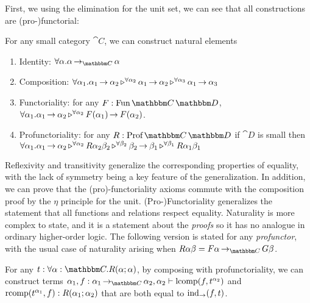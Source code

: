 \documentclass{llncs}
\begin{document}
First, we using the elimination for the unit set, we can see that all
constructions are (pro-)functorial:
\begin{construction}
  \label{construction:synthetic-composition}
  For any small category $\cat C$, we can construct natural elements
  \begin{enumerate}
  \item Identity: $\pendallXdotY {\alpha} {\punitinXfromYtoZ {\cat C}{\alpha}{\alpha}}$
  \item Composition: $\forall \alpha_1. \alpha_1 \mathop{\to_{}} \alpha_2 \mathop{\triangleright^{\forall \alpha_2}} \alpha_1 \mathop{\to_{}} \alpha_2 \mathop{\triangleright^{\forall \alpha_3}} \alpha_1 \mathop{\to_{}} \alpha_3$
  \item Functoriality: for any $F : \varr {\cat C}{\cat D}$, $\forall \alpha_1. \alpha_1 \mathop{\to_{}} \alpha_2 \mathop{\triangleright^{\forall \alpha_2}} F(\alpha_1) \mathop{\to_{}} F(\alpha_2)$.
   \item Profunctoriality: for any $R : \harr {\cat C}{\cat D}$ if
     $\cat D$ is small then \\ $\forall \alpha_1. \alpha_1 \mathop{\to_{}} \alpha_2 \mathop{\triangleright^{\forall \alpha_2}} R{\alpha_2}{\beta_2} \mathop{\triangleright^{\forall \beta_2}} \beta_2 \mathop{\to_{}} \beta_1 \mathop{\triangleright^{\forall \beta_1}} R\alpha_1\beta_1$
  \end{enumerate}
\end{construction}
Reflexivity and transitivity generalize the corresponding properties
of equality, with the lack of symmetry being a key feature of the
generalization.
%
In addition, we can prove that the (pro)-functoriality axioms commute
with the composition proof by the $\eta$ principle for the unit.
%
(Pro-)Functoriality generalizes the statement that all functions and
relations respect equality.
%
Naturality is more complex to state, and it is a statement about the
\emph{proofs} so it has no analogue in ordinary higher-order
logic. The following version is stated for any \emph{profunctor}, with
the usual case of naturality arising when $R \alpha \beta =
\punitinXfromYtoZ {\cat C}{F \alpha}{G \beta}$.
\begin{lemma}[Naturality]
  For any $t : \pendallXdotY {\alpha:\cat C}{\harrapp R \alpha
    \alpha}$, by composing with profunctoriality, we can construct
  terms $\alpha_1, f : \punitinXfromYtoZ {\cat C} {\alpha_1}
  {\alpha_2}, \alpha_2 \vdash \textrm{lcomp}(f,\pendappXtoY t
  {\alpha_2})$ and $\textrm{rcomp}(t^{\alpha_1}, f) :
  R(\alpha_1;\alpha_2)$ that are both equal to
  $\textrm{ind}_{\to}(f,t)$.
\end{lemma}
\end{document}
